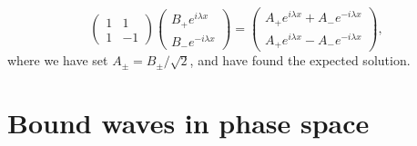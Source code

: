 \begin{example}
\begin{equation}
\begin{pmatrix}
    1 & 1\\
    1 & -1
  \end{pmatrix}
  \begin{pmatrix}
    B_{+}e^{i\lambda x}\\
    B_{-}e^{-i\lambda x}
  \end{pmatrix}
  =
  \begin{pmatrix}
    A_{+}e^{i\lambda x} + A_{-}e^{-i\lambda x}\\
    A_{+}e^{i\lambda x} - A_{-}e^{-i\lambda x}
  \end{pmatrix},
\end{equation}
%
where we have set $A_{\pm} = B_{\pm}/\sqrt{2}$, and have found the expected solution.
\end{example}

\section{Bound waves in phase space}
\label{sec:bound}

